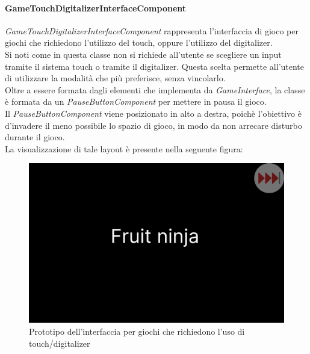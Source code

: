 \paragraph{GameTouchDigitalizerInterfaceComponent}
\emph{GameTouchDigitalizerInterfaceComponent} rappresenta l'interfaccia di gioco per giochi che richiedono l'utilizzo del touch, oppure l'utilizzo del digitalizer.\\
Si noti come in questa classe non si richiede all'utente se scegliere un input tramite il sistema touch o tramite il digitalizer. Questa scelta permette all'utente di utilizzare la modalità che più preferisce, senza vincolarlo.\\
Oltre a essere formata dagli elementi che implementa da \emph{GameInterface}, la classe è formata da un \emph{PauseButtonComponent} per mettere in pausa il gioco.\\
Il \emph{PauseButtonComponent} viene posizionato in alto a destra, poichè l'obiettivo è d'invadere il meno possibile lo spazio di gioco, in modo da non arrecare disturbo durante il gioco.\\
La visualizzazione di tale layout è presente nella seguente figura:
\begin{figure}[h]
    \centering
    \includegraphics[width=340pt]{images/prog/TouchDigitMockup.png}
    \caption{Prototipo dell'interfaccia per giochi che richiedono l'uso di touch/digitalizer}
    \label{fig:touchDigit}
\end{figure}
\newpage
